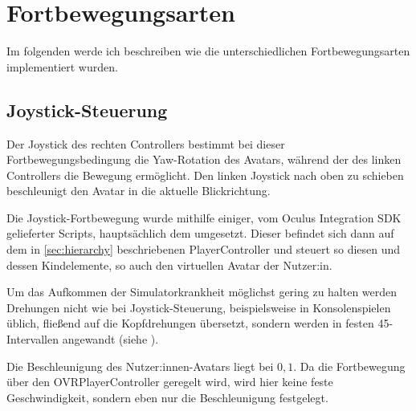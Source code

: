 \section{Fortbewegungsarten}
Im folgenden werde ich beschreiben wie die unterschiedlichen Fortbewegungsarten implementiert wurden.

\subsection{Joystick-Steuerung} \label{subsec:joystick-implementation}
    Der Joystick des rechten Controllers bestimmt bei dieser Fortbewegungsbedingung die Yaw-Rotation des Avatars, während der des linken Controllers die Bewegung ermöglicht. Den linken Joystick nach oben zu schieben beschleunigt den Avatar in die aktuelle Blickrichtung.

    Die Joystick-Fortbewegung wurde mithilfe einiger, vom Oculus Integration SDK gelieferter Scripts, hauptsächlich dem  umgesetzt. Dieser befindet sich dann auf dem in \autoref{sec:hierarchy} beschriebenen PlayerController und steuert so diesen und dessen Kindelemente, so auch den virtuellen Avatar der Nutzer:in.

    Um das Aufkommen der Simulatorkrankheit möglichst gering zu halten
    werden Drehungen nicht wie bei Joystick-Steuerung, beispielsweise in Konsolenspielen üblich, fließend auf die Kopfdrehungen übersetzt, sondern werden in festen 45\textdegree\--Intervallen angewandt (siehe \cite{cybersickness-yasin}).

    Die Beschleunigung des Nutzer:innen-Avatars liegt bei $0,1$. Da die Fortbewegung über den OVRPlayerController geregelt wird, wird hier keine feste Geschwindigkeit, sondern eben nur die Beschleunigung festgelegt.

